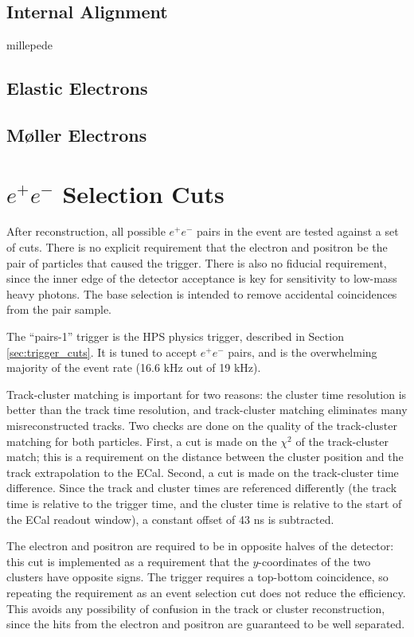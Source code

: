 \subsection{Internal Alignment}
millepede
\subsection{Elastic Electrons}
\label{sec:target_z}
\subsection{M{\o}ller Electrons}
\label{sec:mollers}

\section{\texorpdfstring{$e^+e^-$}{e+e-} Selection Cuts}
\label{sec:event_selection}
After reconstruction, all possible $e^+e^-$ pairs in the event are tested against a set of cuts.
There is no explicit requirement that the electron and positron be the pair of particles that caused the trigger.
There is also no fiducial requirement, since the inner edge of the detector acceptance is key for sensitivity to low-mass heavy photons.
The base selection is intended to remove accidental coincidences from the pair sample.

The ``pairs-1'' trigger is the HPS physics trigger, described in Section \ref{sec:trigger_cuts}.
It is tuned to accept $e^+e^-$ pairs, and is the overwhelming majority of the event rate (16.6 kHz out of 19 kHz).

Track-cluster matching is important for two reasons: the cluster time resolution is better than the track time resolution, and track-cluster matching eliminates many misreconstructed tracks.
Two checks are done on the quality of the track-cluster matching for both particles.
First, a cut is made on the $\chi^2$ of the track-cluster match; this is a requirement on the distance between the cluster position and the track extrapolation to the ECal.
Second, a cut is made on the track-cluster time difference.
Since the track and cluster times are referenced differently (the track time is relative to the trigger time, and the cluster time is relative to the start of the ECal readout window), a constant offset of 43 ns is subtracted.

The electron and positron are required to be in opposite halves of the detector: this cut is implemented as a requirement that the $y$-coordinates of the two clusters have opposite signs.
The trigger requires a top-bottom coincidence, so repeating the requirement as an event selection cut does not reduce the efficiency.
This avoids any possibility of confusion in the track or cluster reconstruction, since the hits from the electron and positron are guaranteed to be well separated.

